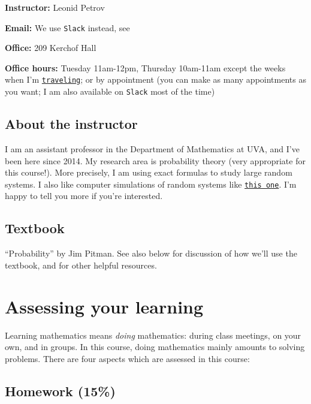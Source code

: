 \documentclass[oneside,11pt]{amsart}
\begin{document}
\bigskip

	\textbf{Instructor:} Leonid Petrov

	\textbf{Email:} We use \texttt{Slack} instead, see 

	\textbf{Office:} 209 Kerchof Hall

	\textbf{Office hours:} 
	Tuesday 11am-12pm, Thursday 10am-11am
	except the weeks when I'm \href{https://lpetrov.cc/2017/07/travel-2018/}{\texttt{traveling}};
	or by appointment (you can make as many appointments as you want;
	I am also available on \texttt{Slack} most of the time)

\subsection{About the instructor}
I am an assistant professor in the Department of Mathematics at UVA, and I've
been here since 2014. My research area is probability theory (very appropriate
for this course!). More precisely, I am using exact formulas to study large
random systems. I also like computer simulations of random systems like 
\href{https://d3m0khvr0ybm92.cloudfront.net/img/blog/heart/UVA_colors_small.png}{\texttt{this one}}.
I'm happy to tell you more if you're
interested.

\subsection{Textbook}

``Probability'' by Jim Pitman.
See also  below for discussion 
of how we'll use the textbook,
and for other helpful resources.

\section{Assessing your learning}

Learning mathematics means \emph{doing} mathematics: during class meetings, on your own, and in groups.
In this course, doing mathematics mainly amounts to solving problems.
There are four aspects which are assessed in this course:

\subsection{Homework (15\%)}
\end{document}
